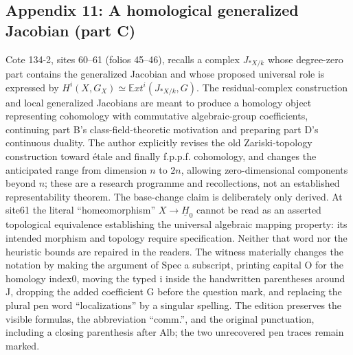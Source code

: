 \subsection*{Appendix 11: A homological generalized Jacobian (part C)}
Cote 134-2, sites 60--61 (folios 45--46), recalls a complex $J_{*X/k}$ whose degree-zero part contains the generalized Jacobian and whose proposed universal role is expressed by $H^i(X,G_X)\simeq\mathbb E xt^i(J_{*X/k},G)$. The residual-complex construction and local generalized Jacobians are meant to produce a homology object representing cohomology with commutative algebraic-group coefficients, continuing part B's class-field-theoretic motivation and preparing part D's continuous duality. The author explicitly revises the old Zariski-topology construction toward étale and finally f.p.p.f. cohomology, and changes the anticipated range from dimension $n$ to $2n$, allowing zero-dimensional components beyond $n$; these are a research programme and recollections, not an established representability theorem. The base-change claim is deliberately only derived. At site61 the literal ``homeomorphism'' $X\to\underline H_0$ cannot be read as an asserted topological equivalence establishing the universal algebraic mapping property: its intended morphism and topology require specification. Neither that word nor the heuristic bounds are repaired in the readers. The witness materially changes the notation by making the argument of Spec a subscript, printing capital O for the homology index0, moving the typed i inside the handwritten parentheses around J, dropping the added coefficient G before the question mark, and replacing the plural pen word ``localizations'' by a singular spelling. The edition preserves the visible formulas, the abbreviation ``comm.'', and the original punctuation, including a closing parenthesis after Alb; the two unrecovered pen traces remain marked.

